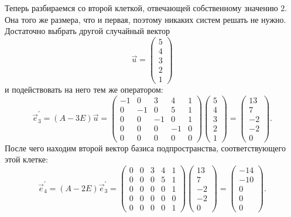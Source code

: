 \begin{solution}
	Теперь разбираемся со второй клеткой, отвечающей собственному значению $2$. Она того же размера, что и первая, поэтому никаких систем решать не нужно. Достаточно выбрать другой случайный вектор
	\[
		\vec{u} =
		\begin{pmatrix}
			5\\
			4\\
			3\\
			2\\
			1
		\end{pmatrix}
	\]
	и подействовать на него тем же оператором:
	\[
		\vec{e}^\prime_3 = (A - 3E)\vec{u} =
		\begin{pmatrix}
			-1 & 0 & 3 & 4 & 1\\
			0 & -1 & 0 & 5 & 1\\
			0 & 0 & -1 & 0 & 1\\
			0 & 0 & 0 & -1 & 0\\
			0 & 0 & 0 & 0 & 0
		\end{pmatrix}
		\begin{pmatrix}
			5\\
			4\\
			3\\
			2\\
			1
		\end{pmatrix} =
		\begin{pmatrix}
			13\\
			7\\
			-2\\
			-2\\
			0
		\end{pmatrix}.
	\]
	После чего находим второй вектор базиса подпространства, соответствующего этой клетке:
	\[
		\vec{e}^\prime_4 = (A - 2E)\vec{e}^\prime_3 =
		\begin{pmatrix}
			0 & 0 & 3 & 4 & 1\\
			0 & 0 & 0 & 5 & 1\\
			0 & 0 & 0 & 0 & 1\\
			0 & 0 & 0 & 0 & 0\\
			0 & 0 & 0 & 0 & 1
		\end{pmatrix}
		\begin{pmatrix}
			13\\
			7\\
			-2\\
			-2\\
			0
		\end{pmatrix} =
		\begin{pmatrix}
			-14\\
			-10\\
			0\\
			0\\
			0
		\end{pmatrix}.
	\]


\end{solution}
